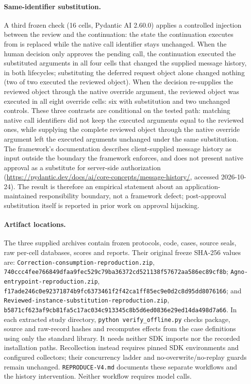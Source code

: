 \paragraph{Same-identifier substitution.}
A third frozen check (16 cells, Pydantic AI 2.60.0) applies a controlled injection
between the review and the continuation: the state the continuation executes from is
replaced while the native call identifier stays unchanged. When the human decision only
approves the pending call, the continuation
executed the substituted arguments in all four cells that changed the supplied message
history, in both lifecycles; substituting the deferred request object alone changed
nothing (two of two executed the reviewed object). When the decision re-supplies the
reviewed object through the native override argument, the reviewed object was executed
in all eight override cells: six with substitution and two unchanged controls. These three contrasts are conditional on the tested path: matching native call
identifiers did not keep the executed arguments equal to the reviewed ones, while
supplying the complete reviewed object through the native override argument left the
executed arguments unchanged under the same substitution. The framework's
documentation describes client-supplied message history as input outside the boundary
the framework enforces, and does not present native approval as a substitute for
server-side authorization
(\url{https://pydantic.dev/docs/ai/core-concepts/message-history/}, accessed
2026-10-24). The result is therefore an empirical statement about an
application-maintained responsibility boundary, not a framework defect; post-approval
substitution itself is reported in prior work on approval hijacking.

\paragraph{Artifact locations.}
The three supplied archives contain frozen protocols, code, cases, source seals,
raw per-cell databases, scores and reports. Their original freeze SHA-256 values are:
\nolinkurl{Correction-consumption-reproduction.zip},
\nolinkurl{740ccc4fee766849dfaa9fec529c79ba36372cd521138f57672aa586ec89cf8b};
\nolinkurl{Agno-entrypoint-reproduction.zip},
\nolinkurl{f17ade246c0e92371874b9fc6373461f2f42ca1ff85ec9e0d2c8d95dd8076166}; and
\nolinkurl{Reviewed-instance-substitution-reproduction.zip},
\nolinkurl{b5871cf623af9cb81fa5c17ac034c913345c8b5d6ed0836e29ed14da498d7a66}.
In each extracted study directory, \texttt{python verify\_offline.py} checks package,
source and raw-record hashes and recomputes effects from the case definitions using
only the standard library. It needs neither SDK imports nor the recorded installation
paths. Recollection instead requires pinned SDK environments and configured collectors;
their concurrency ladder and no-overwrite/no-replay guards remain unchanged.
\texttt{REPRODUCE-V4.md} documents these separate workflows and the history intervention.
Neither workflow requires model calls.

